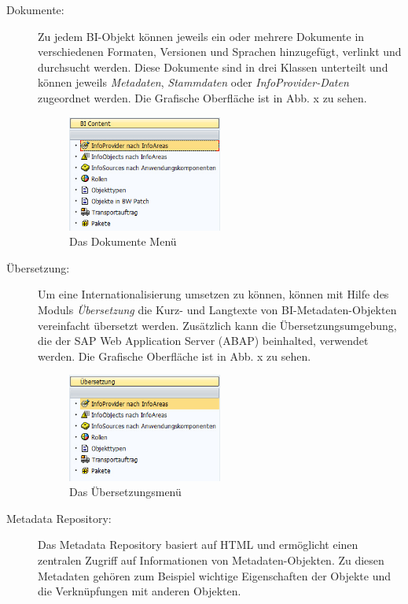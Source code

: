 \begin{description}
\begin{figure}[H]
\end{figure}
\item[Dokumente:] Zu jedem BI-Objekt können jeweils ein oder mehrere Dokumente in verschiedenen Formaten, Versionen und Sprachen hinzugefügt, verlinkt und durchsucht werden. Diese Dokumente sind in drei Klassen unterteilt und können jeweils \textit{Metadaten}, \textit{Stammdaten} oder \textit{InfoProvider-Daten} zugeordnet werden.
Die Grafische Oberfläche ist in Abb. x zu sehen.
\begin{figure}[H]
    \centering
    \includegraphics[width=0.5\textwidth]{files/BIContent}
    \caption{Das Dokumente Menü}
    \label{pic:DWOverview}
\end{figure}
\item[Übersetzung:] Um eine Internationalisierung umsetzen zu können, können mit Hilfe des Moduls \textit{Übersetzung} die Kurz- und Langtexte von BI-Metadaten-Objekten vereinfacht übersetzt werden. Zusätzlich kann die Übersetzungsumgebung, die der SAP Web Application Server (ABAP) beinhalted, verwendet werden.
Die Grafische Oberfläche ist in Abb. x zu sehen.
\begin{figure}[H]
    \centering
    \includegraphics[width=0.5\textwidth]{files/Uebersetzung}
    \caption{Das Übersetzungsmenü}
    \label{pic:DWOverview}
\end{figure}
\item[Metadata Repository:] Das Metadata Repository basiert auf HTML und ermöglicht einen zentralen Zugriff auf Informationen von Metadaten-Objekten. Zu diesen Metadaten gehören zum Beispiel wichtige Eigenschaften der Objekte und die Verknüpfungen mit anderen Objekten.
\end{description}




